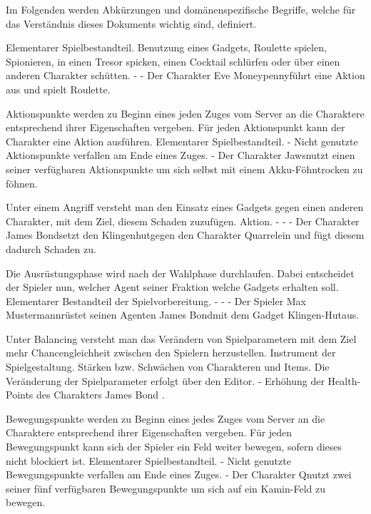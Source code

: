 Im Folgenden werden Abkürzungen und domänenspezifische Begriffe, welche für das Verständnis dieses Dokuments wichtig sind, definiert.

{}
{Elementarer Spielbestandteil.}
{Benutzung eines Gadgets, Roulette spielen, Spionieren, in einen Tresor spicken, einen Cocktail schlürfen oder über einen anderen Charakter schütten.}
{-}
{-}
{Der Charakter \glqq Eve Moneypenny\grqq führt eine Aktion aus und spielt Roulette.}

{Aktionspunkte werden zu Beginn eines jeden Zuges vom Server an die Charaktere entsprechend ihrer Eigenschaften vergeben. Für jeden Aktionspunkt kann der Charakter eine Aktion ausführen.}
{Elementarer Spielbestandteil.}
{-}
{Nicht genutzte Aktionspunkte verfallen am Ende eines Zuges.}
{-}
{Der Charakter \glqq Jaws\grqq nutzt einen seiner verfügbaren Aktionspunkte um sich selbst mit einem \glqq Akku-Föhn\grqq trocken zu föhnen.}

{Unter einem Angriff versteht man den Einsatz eines Gadgets gegen einen anderen Charakter, mit dem Ziel, diesem Schaden zuzufügen.}
{Aktion.}
{-}
{-}
{-}
{Der Charakter \glqq James Bond\grqq setzt den \glqq Klingenhut\grqq gegen den Charakter \glqq Quarrel\grqq ein und fügt diesem dadurch Schaden zu.}

{Die Ausrüstungsphase wird nach der Wahlphase durchlaufen. Dabei entscheidet der Spieler nun, welcher Agent seiner Fraktion welche Gadgets erhalten soll. }
{Elementarer Bestandteil der Spielvorbereitung.}
{-}
{-}
{-}
{Der Spieler \glqq Max Mustermann\grqq rüstet seinen Agenten \glqq James Bond\grqq mit dem Gadget \glqq Klingen-Hut\grqq aus.}

{Unter Balancing versteht man das Verändern von Spielparametern mit dem Ziel mehr Chancengleichheit zwischen den Spielern herzustellen.}
{Instrument der Spielgestaltung.}
{Stärken bzw. Schwächen von Charakteren und Items.}
{Die Veränderung der Spielparameter erfolgt über den Editor.}
{-}
{Erhöhung der Health-Points des Charakters \glqq James Bond \grqq.}

{Bewegungspunkte werden zu Beginn eines jedes Zuges vom Server an die Charaktere entsprechend ihrer Eigenschaften vergeben. Für jeden Bewegungspunkt kann sich der Spieler ein Feld weiter bewegen, sofern dieses nicht blockiert ist.}
{Elementarer Spielbestandteil.}
{-}
{Nicht genutzte Bewegungspunkte verfallen am Ende eines Zuges.}
{-}
{Der Charakter \glqq Q\grqq nutzt zwei seiner fünf verfügbaren Bewegungspunkte um sich auf ein Kamin-Feld zu bewegen.}

